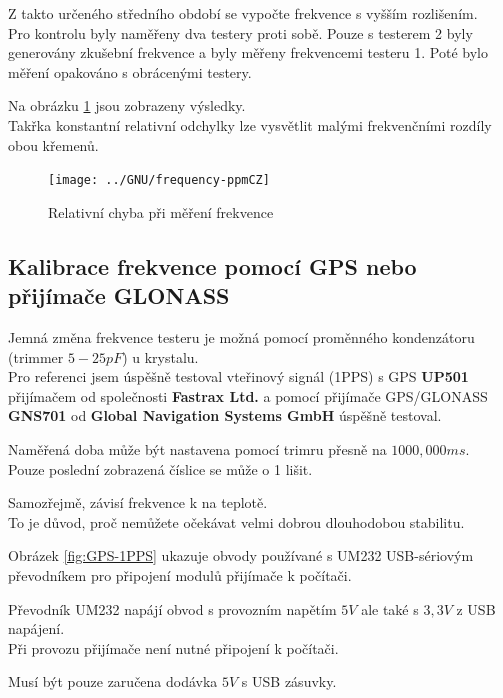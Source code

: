 Z takto určeného středního období se vypočte frekvence s vyšším rozlišením.
\\Pro kontrolu byly naměřeny dva testery proti sobě.
Pouze s testerem 2 byly generovány zkušební frekvence a byly měřeny frekvencemi testeru 1.
Poté bylo měření opakováno s obrácenými testery.

Na obrázku \ref{fig:freq-ppm} jsou zobrazeny výsledky.\\
Takřka konstantní relativní odchylky lze vysvětlit malými frekvenčními rozdíly obou křemenů.

\begin{figure}[H]
\centering
\texttt{[image: ../GNU/frequency-ppmCZ]}
\caption{Relativní chyba při měření frekvence}
\label{fig:freq-ppm}
\end{figure}

\subsection{Kalibrace frekvence pomocí GPS nebo přijímače GLONASS}
Jemná změna frekvence testeru je možná pomocí proměnného kondenzátoru (trimmer \(5-25pF\)) u krystalu.
\\Pro referenci jsem úspěšně testoval vteřinový signál (1PPS) s GPS {\bf UP501} přijímačem od společnosti {\bf Fastrax Ltd.} a
pomocí přijímače GPS/GLONASS {\bf GNS701} od {\bf Global Navigation Systems GmbH} úspěšně testoval.

Naměřená doba může být nastavena pomocí trimru přesně na \(1000,000ms\).
\\Pouze poslední zobrazená číslice se může o 1 lišit.

Samozřejmě, závisí frekvence k na teplotě.
\\To je důvod, proč nemůžete očekávat velmi dobrou dlouhodobou stabilitu.

Obrázek \ref{fig:GPS-1PPS} ukazuje obvody používané s UM232 USB-sériovým převodníkem pro připojení modulů přijímače k ​​počítači.

Převodník UM232 napájí obvod s provozním napětím \(5V\) ale také s \(3,3V\) z USB napájení.
\\Při provozu přijímače není nutné připojení k počítači.

Musí být pouze zaručena dodávka \(5V\) s USB zásuvky.

